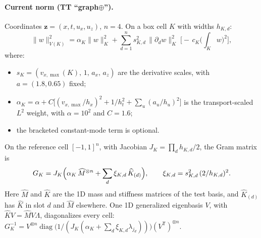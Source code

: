 \documentclass[11pt]{article}
\theoremstyle{remark}
\newcommand{\T}{\mathsf{T}}
\DeclareMathOperator{\diag}{diag}
\begin{document}
\paragraph{Current norm (TT ``graph$\oplus$'').}  Coordinates $\mathbf z=(x,t,u_x,u_z)$, $n=4$.  On a box cell $K$ with
widths $h_{K,d}$:
\[
  \|w\|_{V(K)}^2 = \alpha_K\|w\|_K^2 + \sum_{d=1}^n s_{K,d}^2\,\|\partial_d w\|_K^2\;\bigl[-\,c_K\bigl(\textstyle\int_K w\bigr)^2\bigr],
\]
where:
\begin{itemize}[nosep]
  \item $s_K=(v_{x,\max}(K),\,1,\,a_x,\,a_z)$ are the derivative scales, with $a=(1.8,0.65)$ fixed;
  \item $\alpha_K=\alpha+C\bigl[(v_{x,\max}/h_x)^2+1/h_t^2+\sum_u(a_u/h_u)^2\bigr]$ is the transport-scaled $L^2$
        weight, with $\alpha=10^2$ and $C=1.6$;
  \item the bracketed constant-mode term is optional.
\end{itemize}
On the reference cell $[-1,1]^n$, with Jacobian $J_K=\prod_d h_{K,d}/2$, the Gram matrix is
\[
  G_K = J_K\Bigl(\alpha_K\,\widehat M^{\otimes n}+\sum_d \xi_{K,d}\,\widehat K_{(d)}\Bigr),\qquad \xi_{K,d}=s_{K,d}^2\,(2/h_{K,d})^2 .
\]
Here $\widehat M$ and $\widehat K$ are the 1D mass and stiffness matrices of the test basis, and $\widehat K_{(d)}$ has
$\widehat K$ in slot $d$ and $\widehat M$ elsewhere.  One 1D generalized eigenbasis $V$, with $\widehat KV=\widehat MV\Lambda$,
diagonalizes every cell: $G_K^{-1}=V^{\otimes n}\diag\bigl(1/(J_K(\alpha_K+\sum_d\xi_{K,d}\lambda_{j_d}))\bigr)(V^\T)^{\otimes n}$.
\end{document}
